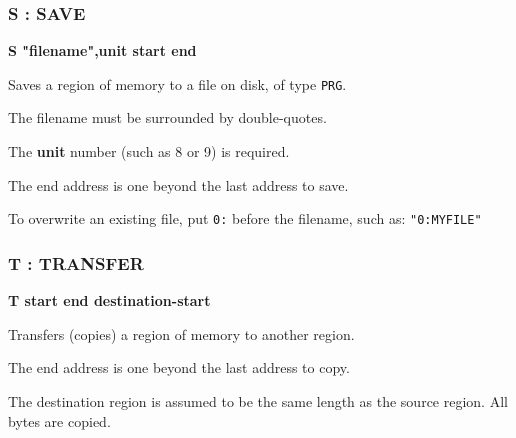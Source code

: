 
\subsubsection{S : SAVE}
\begin{description}[leftmargin=2cm,style=nextline]
\item [Format:] {\bf S "filename",unit start end}
\item [Usage:] Saves a region of memory to a file on disk, of type {\tt PRG}.

\item [Remarks:] The filename must be surrounded by double-quotes.

    The {\bf unit} number (such as 8 or 9) is required.

    The end address is one beyond the last address to save.

    To overwrite an existing file, put {\tt 0:} before the filename, such as: {\tt "0:MYFILE"}

\end{description}


\subsubsection{T : TRANSFER}
\begin{description}[leftmargin=2cm,style=nextline]
\item [Format:] {\bf T start end destination-start}
\item [Usage:] Transfers (copies) a region of memory to another region.

\item [Remarks:] The end address is one beyond the last address to copy.

    The destination region is assumed to be the same length as the source region. All bytes are copied.

\end{description}


